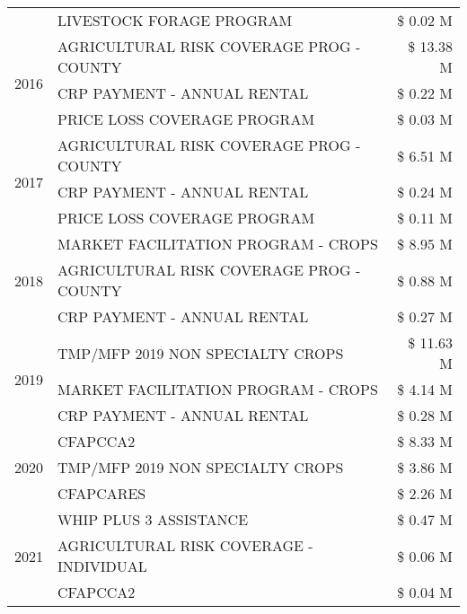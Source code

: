 \begin{tabular}{llr}
 & LIVESTOCK FORAGE PROGRAM & \$ 0.02 M \\
\cline{1-3}
\multirow[t]{3}{*}{2016} & AGRICULTURAL RISK COVERAGE PROG - COUNTY      & \$ 13.38 M \\
 & CRP PAYMENT - ANNUAL RENTAL                   & \$ 0.22 M \\
 & PRICE LOSS COVERAGE PROGRAM                   & \$ 0.03 M \\
\cline{1-3}
\multirow[t]{3}{*}{2017} & AGRICULTURAL RISK COVERAGE PROG - COUNTY & \$ 6.51 M \\
 & CRP PAYMENT - ANNUAL RENTAL & \$ 0.24 M \\
 & PRICE LOSS COVERAGE PROGRAM & \$ 0.11 M \\
\cline{1-3}
\multirow[t]{3}{*}{2018} & MARKET FACILITATION PROGRAM - CROPS & \$ 8.95 M \\
 & AGRICULTURAL RISK COVERAGE PROG - COUNTY & \$ 0.88 M \\
 & CRP PAYMENT - ANNUAL RENTAL & \$ 0.27 M \\
\cline{1-3}
\multirow[t]{3}{*}{2019} & TMP/MFP 2019 NON SPECIALTY CROPS & \$ 11.63 M \\
 & MARKET FACILITATION PROGRAM - CROPS & \$ 4.14 M \\
 & CRP PAYMENT - ANNUAL RENTAL & \$ 0.28 M \\
\cline{1-3}
\multirow[t]{3}{*}{2020} & CFAPCCA2 & \$ 8.33 M \\
 & TMP/MFP 2019 NON SPECIALTY CROPS & \$ 3.86 M \\
 & CFAPCARES & \$ 2.26 M \\
\cline{1-3}
\multirow[t]{3}{*}{2021} & WHIP PLUS 3 ASSISTANCE & \$ 0.47 M \\
 & AGRICULTURAL RISK COVERAGE - INDIVIDUAL & \$ 0.06 M \\
 & CFAPCCA2 & \$ 0.04 M \\
\cline{1-3}
\bottomrule
\end{tabular}
